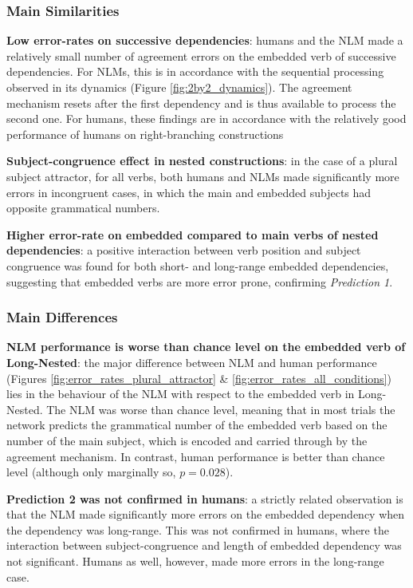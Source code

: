 \subsubsection{Main Similarities}
\begin{APAitemize}
    \item \textbf{Low error-rates on successive dependencies}: humans and the NLM made a relatively small number of agreement errors on the embedded verb of successive dependencies. For NLMs, this is in accordance with the sequential processing observed in its dynamics (Figure \ref{fig:2by2_dynamics}). The agreement mechanism resets after the first dependency and is thus available to process the second one. For humans, these findings are in accordance with the relatively good performance of humans on right-branching constructions \citep[e.g., ][]{blaubergs1974short, miller1964free}
    \item \textbf{Subject-congruence effect in nested constructions}: in the case of a plural subject attractor, for all verbs, both humans and NLMs made significantly more errors in incongruent cases, in which the main and embedded subjects had opposite grammatical numbers.
    \item \textbf{Higher error-rate on embedded compared to main verbs of nested dependencies}: a positive interaction between verb position and subject congruence was found for both short- and long-range embedded dependencies, suggesting that embedded verbs are more error prone, confirming \textit{Prediction 1}.

    
\end{APAitemize}

\subsubsection{Main Differences}
    \begin{APAitemize}
        \item \textbf{NLM performance is worse than chance level on the embedded verb of Long-Nested}: the major difference between NLM and human performance (Figures \ref{fig:error_rates_plural_attractor} \& \ref{fig:error_rates_all_conditions}) lies in the behaviour of the NLM with respect to the embedded verb in Long-Nested. The NLM was worse than chance level, meaning that in most trials the network predicts the grammatical number of the embedded verb based on the number of the main subject, which is encoded and carried through by the agreement mechanism. In contrast, human performance is better than chance level (although only marginally so, $p = 0.028$).
        \item \textbf{Prediction 2 was not confirmed in humans}: a strictly related observation is that the NLM made significantly more errors on the embedded dependency when the dependency was long-range. This was not confirmed in humans, where the interaction between subject-congruence and length of embedded dependency was not significant. Humans as well, however, made more errors in the long-range case.
    \end{APAitemize}
    


